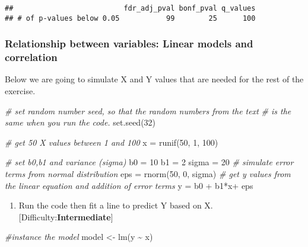 \documentclass[
]{article}
\newenvironment{Shaded}{\begin{snugshade}}{\end{snugshade}}
\newcommand{\CommentTok}[1]{\textcolor[rgb]{0.56,0.35,0.01}{\textit{#1}}}
\newcommand{\DecValTok}[1]{\textcolor[rgb]{0.00,0.00,0.81}{#1}}
\newcommand{\FunctionTok}[1]{\textcolor[rgb]{0.00,0.00,0.00}{#1}}
\newcommand{\NormalTok}[1]{#1}
\newcommand{\OtherTok}[1]{\textcolor[rgb]{0.56,0.35,0.01}{#1}}
\newcommand{\SpecialCharTok}[1]{\textcolor[rgb]{0.00,0.00,0.00}{#1}}
\providecommand{\tightlist}{%
  \setlength{\itemsep}{0pt}\setlength{\parskip}{0pt}}
\begin{document}
\begin{verbatim}
##                          fdr_adj_pval bonf_pval q_values
## # of p-values below 0.05           99        25      100
\end{verbatim}

\hypertarget{relationship-between-variables-linear-models-and-correlation}{%
\subsubsection{Relationship between variables: Linear models and
correlation}\label{relationship-between-variables-linear-models-and-correlation}}

Below we are going to simulate X and Y values that are needed for the
rest of the exercise.

\begin{Shaded}
\begin{Highlighting}[]
\CommentTok{\# set random number seed, so that the random numbers from the text}
\CommentTok{\# is the same when you run the code.}
\FunctionTok{set.seed}\NormalTok{(}\DecValTok{32}\NormalTok{)}

\CommentTok{\# get 50 X values between 1 and 100}
\NormalTok{x }\OtherTok{=} \FunctionTok{runif}\NormalTok{(}\DecValTok{50}\NormalTok{, }\DecValTok{1}\NormalTok{, }\DecValTok{100}\NormalTok{)}

\CommentTok{\# set b0,b1 and variance (sigma)}
\NormalTok{b0 }\OtherTok{=} \DecValTok{10}
\NormalTok{b1 }\OtherTok{=} \DecValTok{2}
\NormalTok{sigma }\OtherTok{=} \DecValTok{20}
\CommentTok{\# simulate error terms from normal distribution}
\NormalTok{eps }\OtherTok{=} \FunctionTok{rnorm}\NormalTok{(}\DecValTok{50}\NormalTok{, }\DecValTok{0}\NormalTok{, sigma)}
\CommentTok{\# get y values from the linear equation and addition of error terms}
\NormalTok{y }\OtherTok{=}\NormalTok{ b0 }\SpecialCharTok{+}\NormalTok{ b1}\SpecialCharTok{*}\NormalTok{x}\SpecialCharTok{+}\NormalTok{ eps}
\end{Highlighting}
\end{Shaded}

\begin{enumerate}
\def\labelenumi{\arabic{enumi}.}
\tightlist
\item
  Run the code then fit a line to predict Y based on X.
  {[}Difficulty:\textbf{Intermediate}{]}
\end{enumerate}

\begin{Shaded}
\begin{Highlighting}[]
\CommentTok{\#instance the model}
\NormalTok{model }\OtherTok{\textless{}{-}} \FunctionTok{lm}\NormalTok{(y }\SpecialCharTok{\textasciitilde{}}\NormalTok{ x)}
\end{Highlighting}
\end{Shaded}
\end{document}
